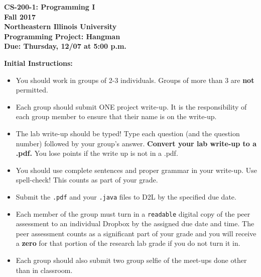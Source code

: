 \documentclass[12pt]{article}
\begin{document}
\begin{center}
	\textbf{CS-200-1: Programming I}\\
	\textbf{Fall 2017}\\
	\textbf{Northeastern Illinois University}\\
	\textbf{Programming Project: Hangman}\\
	\textbf{Due: Thursday, 12/07 at 5:00 p.m.}
\end{center}

\vspace*{0.5cm}
\vspace*{0.5cm}
\noindent\textbf{Initial Instructions:}
\begin{itemize}
	\item You should work in groups of 2-3 individuals. Groups of more than 3 are \textbf{not} permitted.
	\item Each group should submit ONE project write-up. It is the responsibility of each group member to ensure that their name is on the write-up.  
	\item The lab write-up should be typed! Type each question (and the question number) followed by your group's answer. \textbf{Convert your lab write-up to a .pdf.} You lose points if the write up is not in a .pdf.
	\item You should use complete sentences and proper grammar in your write-up. Use spell-check! This counts as part of your grade.
	\item Submit the \texttt{.pdf} and your \texttt{.java} files to D2L by the specified due date.
	\item Each member of the group must turn in a \texttt{readable} digital copy of the peer assessment to an individual Dropbox by the assigned due date and time. The peer assessment counts as a significant part of your grade and you will receive a \textbf{zero} for that portion of the research lab grade if you do not turn it in.
	\item Each group should also submit two group selfie of the meet-ups done other than in classroom.
\end{itemize}
\end{document}

